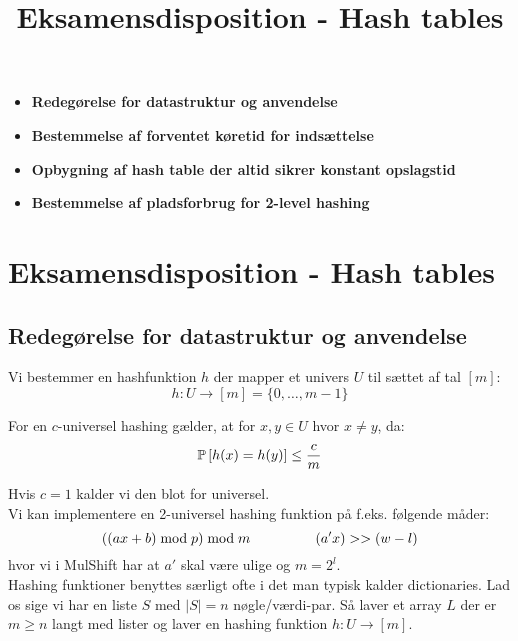 
\title{Eksamensdisposition - Hash tables}


\maketitle

\begin{itemize}
  \item \textbf{Redegørelse for datastruktur og anvendelse}
  \item \textbf{Bestemmelse af forventet køretid for indsættelse}
  \item \textbf{Opbygning af hash table der altid sikrer konstant opslagstid}
  \item \textbf{Bestemmelse af pladsforbrug for 2-level hashing}
\end{itemize}


\newpage
\section{Eksamensdisposition - Hash tables}
\subsection{Redegørelse for datastruktur og anvendelse}
Vi bestemmer en hashfunktion $h$ der mapper et univers $U$ til sættet af tal $[m]$:
$$
  h : U \rightarrow [m] = \{0, \dots, m-1 \}
$$

For en $c$-universel hashing gælder, at for $x, y \in U$ hvor $x \neq y$, da:
$$
\P{h(x) = h(y)} \leq \frac{c}{m}
$$

Hvis $c = 1$ kalder vi den blot for universel.\\

Vi kan implementere en 2-universel hashing funktion på f.eks. følgende måder:
$$
  ((ax + b) \bmod p) \bmod m
  \longspace
  (a' x) >> (w-l)
$$
hvor vi i MulShift har at $a'$ skal være ulige og $m = 2^l$.\\

Hashing funktioner benyttes særligt ofte i det man typisk kalder dictionaries. Lad os sige vi har en liste $S$ med $|S| = n$ nøgle/værdi-par. Så laver et array $L$ der er $m \geq n$ langt med lister og laver en hashing funktion $h : U \rightarrow [m]$.

